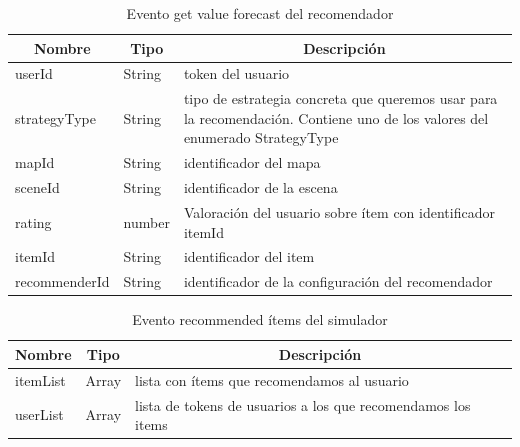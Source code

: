 \begin{table}[H]
	\centering
	\label{my-label}
	\begin{tabular}{|l|l|p{7cm}|}
		\hline
		\multicolumn{1}{|c|}{\textbf{Nombre}} & \multicolumn{1}{c|}{\textbf{Tipo}} & \multicolumn{1}{c|}{\textbf{Descripción}}                                                                                   \\ \hline
		userId                                & String                             & token del usuario                                                                                                           \\ \hline
		strategyType                          & String                             & tipo de estrategia concreta que queremos usar para la recomendación. Contiene uno de los valores del enumerado StrategyType \\ \hline
		mapId                                 & String                             & identificador del mapa                                                                                                      \\ \hline
		sceneId                               & String                             & identificador de la escena                                                                                                  \\ \hline
		rating                                & number                             & Valoración del usuario sobre ítem con identificador itemId                                                                  \\ \hline
		itemId                                & String                             & identificador del item                                                                                                      \\ \hline
		recommenderId                         & String                             & identificador de la configuración del recomendador                                                                          \\ \hline
	\end{tabular}
	\caption{Evento get value forecast del recomendador}
\end{table}

\begin{table}[H]
	\centering
	\label{my-label}
	\begin{tabular}{|l|l|l|}
		\hline
		\multicolumn{1}{|c|}{\textbf{Nombre}} & \multicolumn{1}{c|}{\textbf{Tipo}} & \multicolumn{1}{c|}{\textbf{Descripción}}                    \\ \hline
		itemList                              & Array                              & lista con ítems que recomendamos al usuario                  \\ \hline
		userList                              & Array                              & lista de tokens de usuarios a los que recomendamos los items \\ \hline
	\end{tabular}
	\caption{Evento recommended ítems del simulador}
\end{table}

